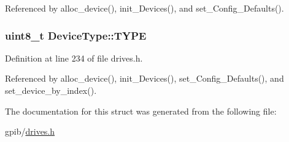 Referenced by alloc\+\_\+device(), init\+\_\+\+Devices(), and set\+\_\+\+Config\+\_\+\+Defaults().

\subsubsection[{\texorpdfstring{T\+Y\+PE}{TYPE}}]{\setlength{\rightskip}{0pt plus 5cm}uint8\+\_\+t Device\+Type\+::\+T\+Y\+PE}\hypertarget{structDeviceType_acee5219162b6f47a9423b2086d127ede}{}\label{structDeviceType_acee5219162b6f47a9423b2086d127ede}


Definition at line 234 of file drives.\+h.



Referenced by alloc\+\_\+device(), init\+\_\+\+Devices(), set\+\_\+\+Config\+\_\+\+Defaults(), and set\+\_\+device\+\_\+by\+\_\+index().



The documentation for this struct was generated from the following file\+:\begin{DoxyCompactItemize}
\item 
gpib/\hyperlink{drives_8h}{drives.\+h}\end{DoxyCompactItemize}
